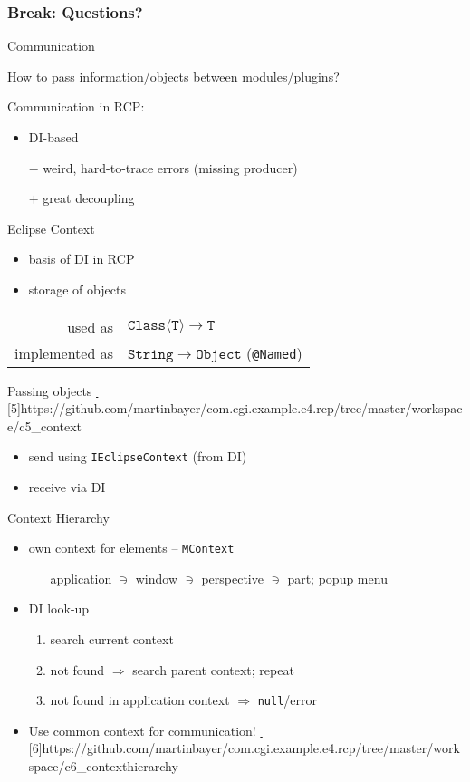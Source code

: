 \documentclass{beamer}
\makeatletter
\newcommand{\@eg}{\raisebox{-0.5mm}{\HandRight}}
\newcommand{\ice@eg}[2][]{\textcolor{ice}{\href{#2}{\@eg\,#1}}}
\newcommand{\pmp@eg}[2][]{\textcolor{pumpkin}{\href{#2}{\@eg\,#1}}}
\def\eg{\@ifstar\ice@eg\pmp@eg}
\newcommand{\fig}{\textcolor{pumpkin}{\raisebox{-0.5mm}{\PencilRightDown}}}
\newcommand{\str}[1]{\structure{#1}}
\newcommand{\breakframe}{\begin{fillerframe}\frametitle{Break: Questions?}\end{fillerframe}}
\newenvironment{centerblock}{\begin{block}{}\begin{center}}{\end{center}\end{block}}
\newcommand{\ttt}[1]{\texttt{\color{honey}#1}}
\newcommand{\mtt}[1]{\ensuremath{\mathtt{#1}}}
\newcommand{\singleindent}[1]{\begin{itemize}\item[] #1\end{itemize}}
\makeatother
\begin{document}
\breakframe

\begin{frame}{Communication}%
	\begin{centerblock}How to pass information/objects between modules/plugins?\end{centerblock}

	\medskip

	Communication in RCP:
	\begin{itemize}
		\item DI-based
		\item[$-$] weird, hard-to-trace errors (missing producer)
		\item[$+$] great decoupling
	\end{itemize}
\end{frame}%
\begin{frame}{Eclipse Context}%
	\begin{itemize}
		\item basis of DI in RCP
		\item storage of objects
	\end{itemize}
	\begin{centerblock}\begin{tabular}{rl}
		used as & $\mtt{Class\langle T\rangle}\to\mtt{T}$\\
		implemented as & $\mtt{String} \to \mtt{Object}$ (\ttt{@Named})\\
	\end{tabular}\end{centerblock}
	Passing objects \eg[5]{https://github.com/martinbayer/com.cgi.example.e4.rcp/tree/master/workspace/c5_context}
	\begin{itemize}
		\item send using \ttt{IEclipseContext} (from DI)
		\item receive via DI
	\end{itemize}
\end{frame}%
\begin{frame}{Context Hierarchy}%
	\begin{itemize}
		\item own context for \str{app model} elements -- \ttt{MContext}\\
			\singleindent{application $\ni$ window $\ni$ perspective $\ni$ part; popup menu}

		\item DI look-up \fig
			\begin{enumerate}
				\item search current context
				\item not found $\Rightarrow$ search parent context; \alert{repeat}
				\item not found in application context $\Rightarrow$ \texttt{null}/error
			\end{enumerate}

		\item \alert{Use common context for communication!} \eg[6]{https://github.com/martinbayer/com.cgi.example.e4.rcp/tree/master/workspace/c6_contexthierarchy}
	\end{itemize}
\end{frame}%
\end{document}
